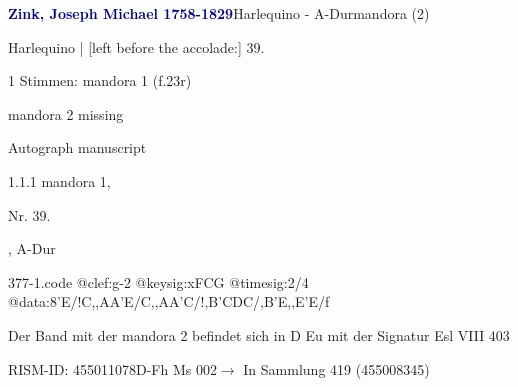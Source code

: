 \documentclass[twocolumn, 12pt]{book}
\begin{document}
\par \vspace{16pt} \textcolor{darkblue}{\textbf{Zink, Joseph Michael  1758-1829}}\hfillplus{\textbf{[377]}}\newline Harlequino - A-Dur\newline mandora (2)
\par \begin{itshape}[f.23r, at left:] Harlequino | [left before the accolade:] 39.\end{itshape} 
\par \textcolor{darkblue}{}  1 Stimmen: mandora 1  (f.23r)\newline \begin{small} mandora 2 missing\end{small} \newline Autograph manuscript
\par 1.1.1  mandora 1, \begin{itshape}Nr. 39.\end{itshape}, A-Dur  
\begin{filecontents*}{377-1.code}
@clef:g-2
@keysig:xFCG
@timesig:2/4
@data:8'E/!C,,AA'E/C,,AA'C/!{,B'C}{DC}/,B'E,,E'E/f
\end{filecontents*}
\newline %
\par Der Band mit der mandora 2 befindet sich in D Eu mit der Signatur Esl VIII 403
\par RISM-ID: 455011078\newline D-Fh  Ms 002\newline $\rightarrow$ In Sammlung 419 (455008345)
      
\end{document}
